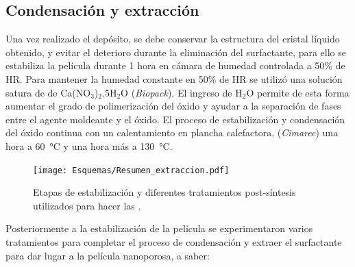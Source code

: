 				  \pagebreak

	\subsection{Condensación y extracción}\label{sec:cond_y_extr}

		Una vez realizado el depósito, se debe conservar la estructura del cristal líquido obtenido, y evitar el deterioro durante la eliminación del surfactante, para ello se estabiliza la película durante 1 hora en cámara de humedad controlada a 50\% de HR. Para mantener la humedad constante en 50\% de HR se utilizó una solución satura de de Ca(NO$_3$)$_2$.5H$_2$O (\textit{Biopack}). El ingreso de H$_2$O permite de esta forma aumentar el grado de polimerización del óxido y ayudar a la separación de fases entre el agente moldeante y el óxido. El proceso de estabilización y condensación del óxido continua con un calentamiento en plancha calefactora, (\textit{Cimarec}) una hora a \SI{60}{\celsius} y una hora más a \SI{130}{\celsius}\cite{Crepaldi2003,Crepaldi2002a}. 
			\begin{figure}[ht!]
						  \begin{center}
						  \texttt{[image: Esquemas/Resumen\_extraccion.pdf]}
						  \caption[Tratamientos post-síntesis de \pdm]{Etapas de estabilización y diferentes tratamientos post-síntesis utilizados para hacer las \pdm.}
						  \label{esq:peliculas_meso_tratamientos}
						  \end{center}
						  \end{figure}
		Posteriormente a la estabilización de la película se experimentaron varios tratamientos para completar el proceso de condensación y extraer el surfactante para dar lugar a la película nanoporosa, a saber:

